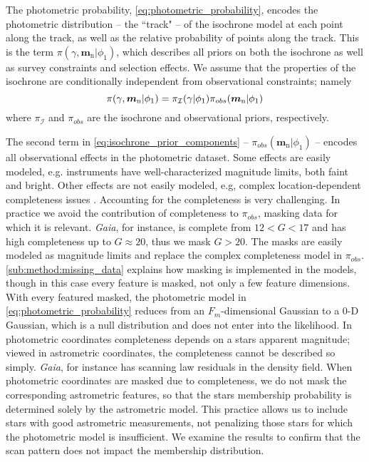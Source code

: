 \documentclass[twocolumn]{aastex631}
\newcommand{\dataarchive}[1]{\textit{#1}}
\newcommand{\Gaia}{\dataarchive{Gaia}}
\newcommand{\mrm}[1]{\mathrm{#1}}
\newcommand{\mbs}[1]{\boldsymbol{#1}}
\newcommand{\mcal}[1]{\mathcal{#1}}
\newcommand{\prior}{\mcal{\pi}}
\newcommand{\nth}[1]{{#1}_{\mrm{n}}}  %
\begin{document}
            The photometric probability, \autoref{eq:photometric_probability},
            encodes the photometric distribution -- the ``track" -- of the
            isochrone model at each point along the track, as well as the
            relative probability of points along the track. This is the term
            $\prior(\gamma, \nth{\mbs{m}} | \phi_1)$, which describes all priors
            on both the isochrone as well as survey constraints and selection
            effects. We assume that the properties of the isochrone are
            conditionally independent from observational constraints; namely
            \begin{equation} \label{eq:isochrone_prior_components}
                \prior(\gamma, \nth{\mbs{m}} | \phi_1) = \prior_{\cal{I}}(\gamma | \phi_1) \prior_{obs}(\nth{\mbs{m}} | \phi_1)
            \end{equation}
            where $\prior_{\mcal{I}}$ and $\prior_{obs}$ are the isochrone and
            observational priors, respectively.
            
            The second term in \autoref{eq:isochrone_prior_components} --
            $\prior_{obs}(\nth{\mbs{m}} | \phi_1)$ -- encodes all observational
            effects in the photometric dataset. Some effects are easily modeled,
            e.g. instruments have well-characterized magnitude limits, both
            faint and bright. Other effects are not easily modeled, e.g, complex
            location-dependent completeness issues \citep{GaiaCompleteness}.
            Accounting for the completeness is very challenging. In practice we
            avoid the contribution of completeness to $\prior_{obs}$, masking
            data for which it is relevant. \Gaia, for instance, is complete from
            $12 < G < 17$ and has high completeness up to $G \approx 20$, thus
            we mask $G > 20$.  The masks are easily modeled as magnitude limits
            and replace the complex completeness model in $\prior_{obs}$.
            \autoref{sub:method:missing_data} explains how masking is
            implemented in the models, though in this case every feature is
            masked, not only a few feature dimensions. With every featured
            masked, the photometric model in
            \autoref{eq:photometric_probability} reduces from an
            $F_m$-dimensional Gaussian to a 0-D Gaussian, which is a null
            distribution and does not enter into the likelihood.  In photometric
            coordinates completeness depends on a stars apparent magnitude;
            viewed in astrometric coordinates, the completeness cannot be
            described so simply. \Gaia, for instance has scanning law residuals
            in the density field. When photometric coordinates are masked due to
            completeness, we do not mask the corresponding  astrometric
            features, so that the stars membership probability is determined
            solely by the astrometric model. This practice allows us to include
            stars with good astrometric measurements, not penalizing those stars
            for which the photometric model is insufficient.  We examine the
            results to confirm that the scan pattern does not impact the
            membership distribution.
\end{document}
